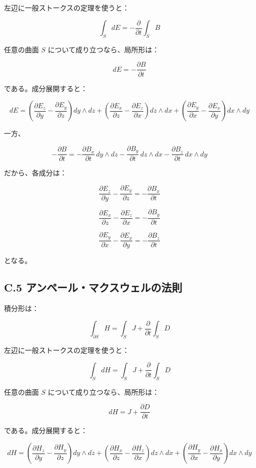\documentclass[a4paper,12pt,openany]{book}
\begin{document}
左辺に一般ストークスの定理を使うと：

\[
\int_S dE
=
-\frac{\partial}{\partial t}\int_S B
\]

任意の曲面 \(S\) について成り立つなら、局所形は：

\[
dE=-\frac{\partial B}{\partial t}
\]

である。成分展開すると：

\[dE = \left(\frac{\partial E_z}{\partial y}-\frac{\partial E_y}{\partial z}\right)dy\wedge dz + \left(\frac{\partial E_x}{\partial z}-\frac{\partial E_z}{\partial x}\right)dz\wedge dx + \left(\frac{\partial E_y}{\partial x}-\frac{\partial E_x}{\partial y}\right)dx\wedge dy\]

一方、

\[
-\frac{\partial B}{\partial t}
=
-\frac{\partial B_x}{\partial t}\,dy\wedge dz
-\frac{\partial B_y}{\partial t}\,dz\wedge dx
-\frac{\partial B_z}{\partial t}\,dx\wedge dy
\]

だから、各成分は：

\[
\frac{\partial E_z}{\partial y}
-
\frac{\partial E_y}{\partial z}
=
-\frac{\partial B_x}{\partial t}
\]

\[
\frac{\partial E_x}{\partial z}
-
\frac{\partial E_z}{\partial x}
=
-\frac{\partial B_y}{\partial t}
\]

\[
\frac{\partial E_y}{\partial x}
-
\frac{\partial E_x}{\partial y}
=
-\frac{\partial B_z}{\partial t}
\]

となる。

\hypertarget{c.5-ux30a2ux30f3ux30daux30fcux30ebux30deux30afux30b9ux30a6ux30a7ux30ebux306eux6cd5ux5247}{%
\subsection*{C.5
アンペール・マクスウェルの法則}\label{c.5-ux30a2ux30f3ux30daux30fcux30ebux30deux30afux30b9ux30a6ux30a7ux30ebux306eux6cd5ux5247}}

積分形は：

\[
\int_{\partial S}H
=
\int_SJ+\frac{\partial}{\partial t}\int_S D
\]

左辺に一般ストークスの定理を使うと：

\[
\int_S dH
=
\int_SJ+\frac{\partial}{\partial t}\int_S D
\]

任意の曲面 \(S\) について成り立つなら、局所形は：

\[
dH=J+\frac{\partial D}{\partial t}
\]

である。成分展開すると：

\[dH = \left(\frac{\partial H_z}{\partial y}-\frac{\partial H_y}{\partial z}\right)dy\wedge dz + \left(\frac{\partial H_x}{\partial z}-\frac{\partial H_z}{\partial x}\right)dz\wedge dx + \left(\frac{\partial H_y}{\partial x}-\frac{\partial H_x}{\partial y}\right)dx\wedge dy\]
\end{document}
